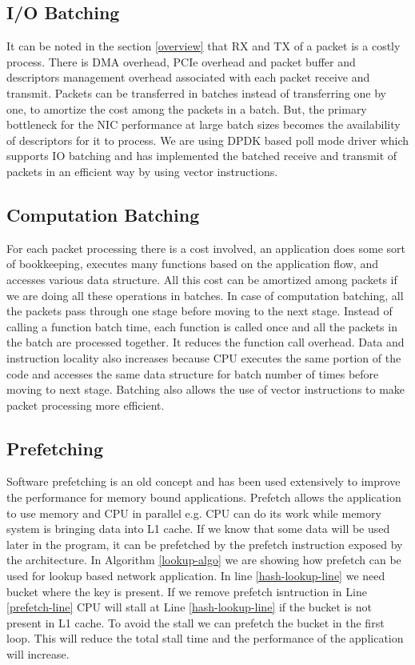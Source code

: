 \subsection{I/O Batching}
\label{iobatching}
It can be noted in the section \ref{overview} that RX and TX of a packet is a costly process. There is DMA overhead, PCIe overhead and packet buffer and descriptors management overhead associated with each packet receive and transmit. Packets can be transferred in batches instead of transferring one by one, to amortize the cost among the packets in a batch. But, the primary bottleneck for the NIC performance at large batch sizes becomes the availability of descriptors for it to process. We are using DPDK based poll mode driver which supports IO batching and has implemented the batched receive and transmit of packets in an efficient way by using vector instructions.

\subsection{Computation Batching}
\label{computationbatching}
For each packet processing there is a cost involved, an application does some sort of bookkeeping, executes many functions based on the application flow, and accesses various data structure. All this cost can be amortized among packets if we are doing all these operations in batches. In case of computation batching, all the packets pass through one stage before moving to the next stage. Instead of calling a function batch time, each function is called once and all the packets in the batch are processed together. It reduces the function call overhead. Data and instruction locality also increases because CPU executes the same portion of the code and accesses the same data structure for batch number of times before moving to next stage. Batching also allows the use of vector instructions to make packet processing more efficient.

\subsection{Prefetching}
\label{prefetching}
Software prefetching is an old concept and has been used extensively to improve the performance for memory bound applications. Prefetch allows the application to use memory and CPU in parallel e.g. CPU can do its work while memory system is bringing data into L1 cache. If we know that some data will be used later in the program, it can be prefetched by the prefetch instruction exposed by the architecture. In Algorithm \ref{lookup-algo} we are showing how prefetch can be used for lookup based network application. In line \ref{hash-lookup-line} we need bucket where the key is present. If we remove prefetch isntruction in Line \ref{prefetch-line} CPU will stall at Line \ref{hash-lookup-line} if the bucket is not present in L1 cache. To avoid the stall we can prefetch the bucket in the first loop. This will reduce the total stall time and the performance of the application will increase.

